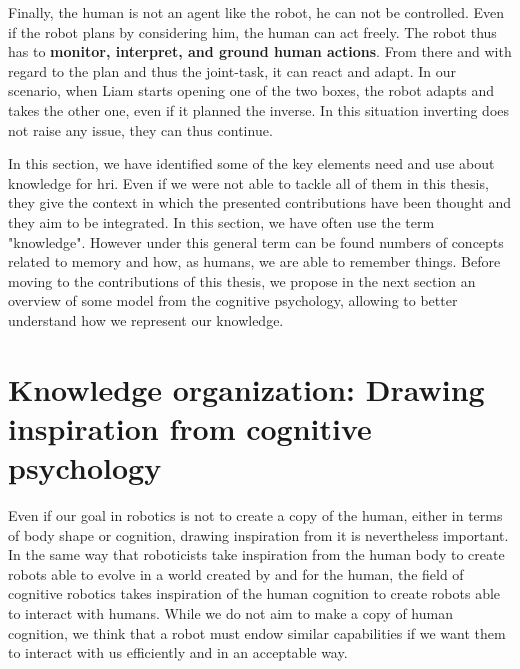 Finally, the human is not an agent like the robot, he can not be controlled. Even if the robot plans by considering him, the human can act freely. The robot thus has to \textbf{monitor, interpret, and ground human actions}. From there and with regard to the plan and thus the joint-task, it can react and adapt. In our scenario, when Liam starts opening one of the two boxes, the robot adapts and takes the other one, even if it planned the inverse. In this situation inverting does not raise any issue, they can thus continue.

In this section, we have identified some of the key elements need and use about knowledge for \acrfull{hri}. Even if we were not able to tackle all of them in this thesis, they give the context in which the presented contributions have been thought and they aim to be integrated. In this section, we have often use the term "knowledge". However under this general term can be found numbers of concepts related to memory and how, as humans, we are able to remember things. Before moving to the contributions of this thesis, we propose in the next section an overview of some model from the cognitive psychology, allowing to better understand how we represent our knowledge.

\section[Knowledge organization]{Knowledge organization: Drawing inspiration from cognitive psychology }

Even if our goal in robotics is not to create a copy of the human, either in terms of body shape or cognition, drawing inspiration from it is nevertheless important. In the same way that roboticists take inspiration from the human body to create robots able to evolve in a world created by and for the human, the field of cognitive robotics takes inspiration of the human cognition to create robots able to interact with humans. While we do not aim to make a copy of human cognition, we think that a robot must endow similar capabilities if we want them to interact with us efficiently and in an acceptable way.

